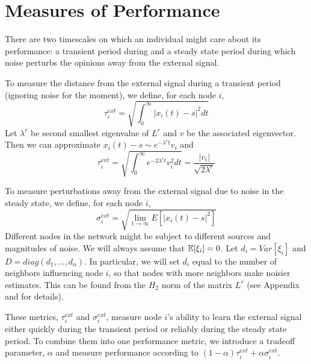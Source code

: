 \documentclass{article}
\begin{document}
\section{Measures of Performance \label{measures}}
There are two timescales on which an individual might care about its performance: a transient period during and a steady state period during which noise perturbs the opinions away from the external signal.


To measure the distance  from the external signal during a transient period (ignoring noise for the moment), we define, for each node $i$,
\begin{equation}
\tau_i^{ext}=\sqrt{\int_0^\infty |x_i(t)-s|^2dt}
\end{equation}
Let $\lambda^r$ be second smallest eigenvalue of $L^r$ and $v$ be the associated eigenvector.  Then we can approximate $x_i(t)-s\sim e^{-\lambda^rt}v_i$ and
\begin{equation}
\tau_i^{ext}=\sqrt{\int_0^\infty e^{-2\lambda^rt}v_i^2dt}=\frac{|v_i|}{\sqrt{2\lambda^r}}
\end{equation}


To measure perturbations away from the external signal due to noise in the steady state, we define, for each node $i$,
\begin{equation}
\sigma_i^{ext}=\sqrt{\lim_{t\to\infty}E[|x_i(t)-s|^2]}
\end{equation}
Different nodes in the network might be subject to different sources and magnitudes of noise.  We will always assume that ${\mathbb{E}}[\xi_i]=0$.  Let $d_i=Var[\xi_i]$ and $D=diag(d_1,\dots,d_n)$.  In particular, we will set $d_i$ equal to the number of neighbors influencing node $i$, so that nodes with more neighbors make noisier estimates.  This can be found from the $H_2$ norm of the matrix $L^r$ (see Appendix and \cite{Young:2010fk} for details).

These metrics, $\tau_i^{ext}$ and $\sigma_i^{ext}$, measure node $i$'s ability to learn the external signal either quickly during the transient period or reliably during the steady state period.  To combine them into one performance metric, we introduce a tradeoff parameter, $\alpha$ and measure performance according to $(1-\alpha)\tau_i^{ext}+\alpha\sigma_i^{ext}$.
\end{document}
